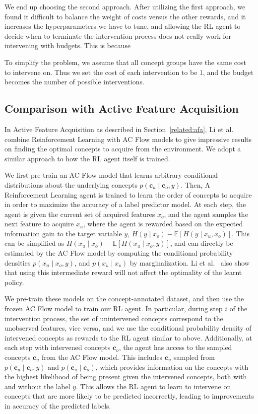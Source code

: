 \documentclass[../main.tex]{subfiles}
\begin{document}
We end up choosing the second approach. After utilizing the first approach,
we found it difficult to balance the weight of costs versus the other rewards, and 
it increases the hyperparameters we have to tune, and allowing the RL agent to decide 
when to terminate the intervention process does not really work for intervening with budgets.
This is because 

To simplify the problem, we assume that all concept groups have the same cost
to intervene on. Thus we set the cost of each intervention to be 1, and the budget
becomes the number of possible interventions.

\subsection{Comparison with Active Feature Acquisition}

In Active Feature Acquisition as described in Section~\ref{related:afa},
Li et al.~\cite{afa} combine Reinforcement Learning with 
AC Flow models to give impressive results on finding the optimal concepts to acquire from the environment. We
adopt a similar approach to how the RL agent itself is trained.

We first pre-train an AC Flow model that learns arbitrary conditional distributions about the underlying
concepts $p(\mathbf{c}_u \mid \mathbf{c}_o, y)$. Then, A Reinforcement Learning agent is trained to learn 
the order of concepts to acquire in order to maximize the accuracy of a label predictor model. At each
step, the agent is given the current set of acquired features $x_o$, and the agent samples the next 
feature to acquire $x_u$, where the agent is rewarded based on the expected information gain
to the target variable $y$, $H(y \mid x_o) - \mathbb{E} [H(y \mid x_u, x_o)]$. This can be simplified as
$H(x_u \mid x_o) - \mathbb{E}[H(x_u \mid x_o, y)]$, and can directly be estimated by the AC 
Flow model by computing the conditional probability densities $p(x_u \mid x_o, y)$, and 
$p(x_u \mid x_o)$ by marginalization. Li et al.~\cite{afa} 
also show that using this intermediate reward will not affect the optimality of the learnt policy.

We pre-train these models on the concept-annotated dataset, and then use the frozen AC Flow
model to train our RL agent.
In particular, during step $i$ of the intervention process, the set of unintervened concepts correspond 
to the unobserved features, vice versa, and we use the conditional probability density of 
intervened concepts as rewards to the RL agent similar to above. Additionally, at each step
with intervened concepts $\mathbf{c}_o$, the agent has access to the sampled concepts $\mathbf{c}_u$ from the AC Flow model.
This includes $\mathbf{c}_u$ sampled from $p(\mathbf{c}_u \mid \mathbf{c}_o, y)$ and $p(\mathbf{c}_u \mid \mathbf{c}_o)$, which provides information
on the concepts with the highest likelihood of being present given the intervened concepts, both with and without
the label $y$. This allows the RL agent to learn to intervene on concepts that are 
more likely to be predicted incorrectly, leading to improvements in accuracy of the predicted labels.
\end{document}
